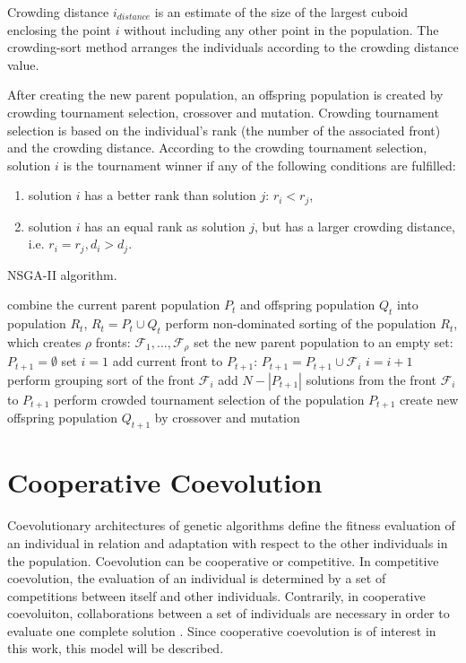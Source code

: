 Crowding distance $i_{distance}$ is an estimate of the size of the largest cuboid enclosing the point $i$ without including any other point in the population. 
The crowding-sort method arranges the individuals according to the crowding distance value.

After creating the new parent population, an offspring population is created by crowding tournament selection, crossover and mutation. 
Crowding tournament selection is based on the individual's rank (the number of the associated front) and the crowding distance. 
According to the crowding tournament selection, solution $i$ is the tournament winner if any of the following conditions are fulfilled:
\begin{enumerate}
	\item solution $i$ has a better rank than solution $j$: $r_i < r_j$,
	\item solution $i$ has an equal rank as solution $j$, but has a larger crowding distance, i.e. $r_i=r_j, d_i > d_j$.
\end{enumerate}

\begin{algorithm}
\caption{NSGA-II algorithm.\label{nsga-ii}}
\begin{algorithmic}[1]
\State combine the current parent population $P_t$ and offspring population $Q_t$ into population $R_t$, $R_t = P_t \cup Q_t$
\State perform non-dominated sorting of the population $R_t$, which creates $\rho$ fronts: 
$\mathcal{F}_1, ..., \mathcal{F}_\rho$ 
\State set the new parent population to an empty set: $P_{t+1} = \emptyset$
\State set $i=1$
\State add current front to $P_{t+1}$: $P_{t+1} = P_{t+1} \cup \mathcal{F}_i$
\State $i=i+1$
\EndWhile
\State perform grouping sort of the front $\mathcal{F}_i$
\State add $N-|P_{t+1}|$ solutions from the front $\mathcal{F}_i$ to $P_{t+1}$
\State perform crowded tournament selection of the population $P_{t+1}$
\State create new offspring population $Q_{t+1}$ by crossover and mutation
\end{algorithmic}
\end{algorithm}

\section{Cooperative Coevolution}
Coevolutionary architectures of genetic algorithms define the fitness evaluation of an individual in relation and adaptation with respect to the other individuals in the population. 
Coevolution can be cooperative or competitive. 
In competitive coevolution, the evaluation of an individual is determined by a set of competitions between itself and other individuals. 
Contrarily, in cooperative coevoluiton, collaborations between a set of individuals are necessary in order to evaluate one complete solution \cite{stoean2014support}. 
Since cooperative coevolution is of interest in this work, this model will be described. 

